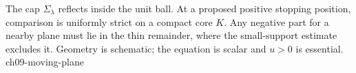 {The cap $\Sigma_\lambda$ reflects inside the unit ball. At a proposed positive stopping position, comparison is uniformly strict on a compact core $K$. Any negative part for a nearby plane must lie in the thin remainder, where the small-support estimate excludes it. Geometry is schematic; the equation is scalar and $u>0$ is essential.}
{ch09-moving-plane}
\Needspace{42mm}
